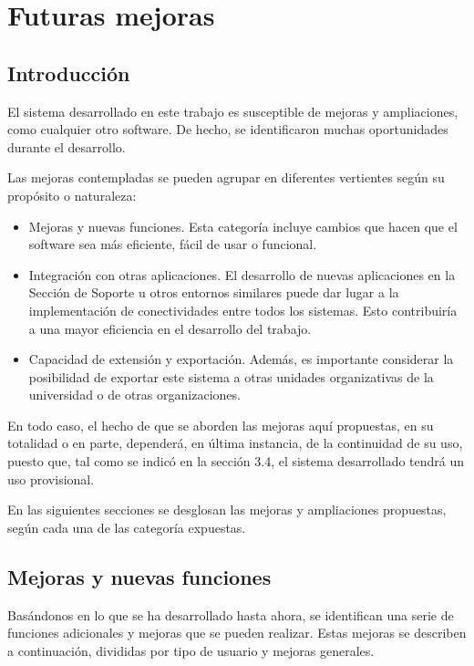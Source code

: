 \chapter{Futuras mejoras}

\section{Introducción}
El sistema desarrollado en este trabajo es susceptible de mejoras y ampliaciones, como cualquier otro software. De hecho, se identificaron muchas oportunidades durante el desarrollo.

Las mejoras contempladas se pueden agrupar en diferentes vertientes según su propósito o naturaleza:

\begin{itemize}
    \item Mejoras y nuevas funciones. Esta categoría incluye cambios que hacen que el software sea más eficiente, fácil de usar o funcional.
    
    \item Integración con otras aplicaciones. El desarrollo de nuevas aplicaciones en la Sección de Soporte u otros entornos similares puede dar lugar a la implementación de conectividades entre todos los sistemas. Esto contribuiría a una mayor eficiencia en el desarrollo del trabajo.
    
    \item Capacidad de extensión y exportación. Además, es importante considerar la posibilidad de exportar este sistema a otras unidades organizativas de la universidad o de otras organizaciones.
\end{itemize}

En todo caso, el hecho de que se aborden las mejoras aquí propuestas, en su totalidad o en parte, dependerá, en última instancia, de la continuidad de su uso, puesto que, tal como se indicó en la sección 3.4, el sistema desarrollado tendrá un uso provisional.

En las siguientes secciones se desglosan las mejoras y ampliaciones propuestas, según cada una de las categoría expuestas.

\section{Mejoras y nuevas funciones}
Basándonos en lo que se ha desarrollado hasta ahora, se identifican una serie de funciones adicionales y mejoras que se pueden realizar. Estas mejoras se describen a continuación, divididas por tipo de usuario y mejoras generales.

